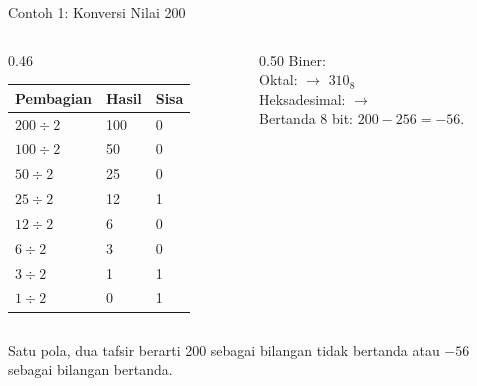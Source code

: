 \documentclass[aspectratio=169,11pt]{beamer}
\begin{document}
\begin{frame}{Contoh 1: Konversi Nilai 200}
\small
\begin{columns}[t]
\begin{column}{0.46\textwidth}
\footnotesize
\begin{tabular}{@{}p{2.4cm}p{1.8cm}p{1.0cm}@{}}
    \toprule
    \textbf{Pembagian} & \textbf{Hasil} & \textbf{Sisa} \\
    \midrule
    $200 \div 2$ & 100 & 0 \\
    $100 \div 2$ & 50 & 0 \\
    $50 \div 2$ & 25 & 0 \\
    $25 \div 2$ & 12 & 1 \\
    $12 \div 2$ & 6 & 0 \\
    $6 \div 2$ & 3 & 0 \\
    $3 \div 2$ & 1 & 1 \\
    $1 \div 2$ & 0 & 1 \\
    \bottomrule
\end{tabular}
\end{column}
\begin{column}{0.50\textwidth}
\footnotesize
Biner: \\[0.3em]
Oktal:  $\rightarrow$ $310_8$\\[0.3em]
Heksadesimal:  $\rightarrow$ \\[0.3em]
Bertanda 8 bit: $200 - 256 = -56$.
\end{column}
\end{columns}

\vspace{0.35em}
\begin{block}{Satu pola, dua tafsir}
\small {} berarti 200 sebagai bilangan tidak bertanda atau
$-56$ sebagai bilangan bertanda.
\end{block}
\end{frame}
\end{document}
